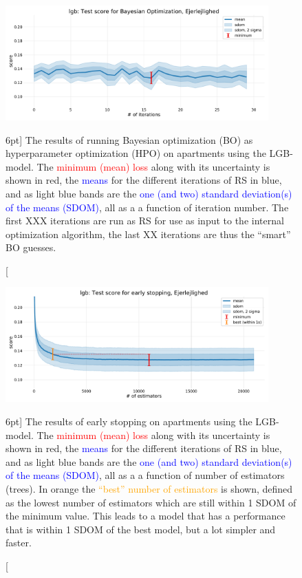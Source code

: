 \documentclass[a4paper, twoside]{tufte-book}
\newcommand{\q}[1]{``#1''}
\begin{document}
\begin{figure}
  \includegraphics[width=0.9\textwidth, trim=0 0 0 40, clip]{figures/housing/Ejerlejlighed_v17_cut_all_Ncols_all_lgb_score_over_time_BO.pdf}
  \caption[Hyperparameter optimization: Bayesian optimization results][6pt]
          {The results of running Bayesian optimization (BO) as hyperparameter optimization (HPO) on apartments using the LGB-model. The \textcolor{red}{minimum (mean) loss} along with its uncertainty is shown in red, the \textcolor{blue}{means} for the different iterations of RS in blue, and as light blue bands are the \textcolor{blue}{one (and two) standard deviation(s) of the means (SDOM)}, all as a a function of iteration number. The first XXX iterations are run as RS for use as input to the internal optimization algorithm, the last XX iterations are thus the \q{smart} BO guesses.
          } 
  \label{fig:h:BO_lgb_apartment}
\end{figure}


\begin{figure}
  \includegraphics[width=0.9\textwidth, trim=0 0 0 40, clip]{figures/housing/Ejerlejlighed_v17_cut_all_Ncols_all_lgb_early_stopping_fig.pdf}
  \caption[Early Stopping results][6pt]
          {The results of early stopping on apartments using the LGB-model. The \textcolor{red}{minimum (mean) loss} along with its uncertainty is shown in red, the \textcolor{blue}{means} for the different iterations of RS in blue, and as light blue bands are the \textcolor{blue}{one (and two) standard deviation(s) of the means (SDOM)}, all as a a function of number of estimators (trees). In orange the \textcolor{orange}{\q{best} number of estimators} is shown, defined as the lowest number of estimators which are still within 1 SDOM of the minimum value. This leads to a model that has a performance that is within 1 SDOM of the best model, but a lot simpler and faster.  
          } 
  \label{fig:h:early_stopping}
\end{figure}
\end{document}
